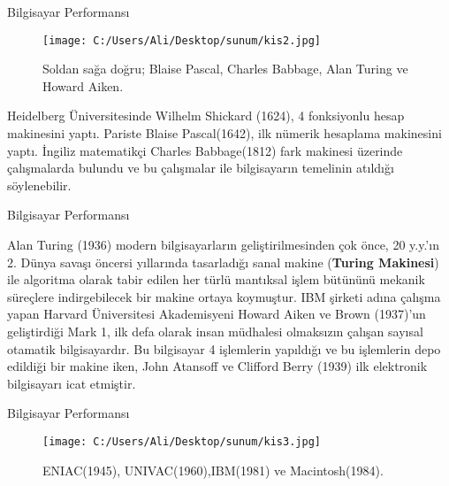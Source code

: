 \documentclass[
  12pt,
  ignorenonframetext,
]{beamer}
\begin{document}
\begin{frame}{Bilgisayar Performansı}
\protect\hypertarget{bilgisayar-performansux131-2}{}

\begin{figure}
\centering
\texttt{[image: C:/Users/Ali/Desktop/sunum/kis2.jpg]}
\caption{Soldan sağa doğru; Blaise Pascal, Charles Babbage, Alan Turing
ve Howard Aiken.}
\end{figure}

\justify

Heidelberg Üniversitesinde Wilhelm Shickard (1624), 4 fonksiyonlu hesap
makinesini yaptı. Pariste Blaise Pascal(1642), ilk nümerik hesaplama
makinesini yaptı. İngiliz matematikçi Charles Babbage(1812) fark
makinesi üzerinde çalışmalarda bulundu ve bu çalışmalar ile bilgisayarın
temelinin atıldığı söylenebilir.

\end{frame}

\begin{frame}{Bilgisayar Performansı}
\protect\hypertarget{bilgisayar-performansux131-3}{}

\justify

Alan Turing (1936) modern bilgisayarların geliştirilmesinden çok önce,
20 y.y.'ın 2. Dünya savaşı öncersi yıllarında tasarladığı sanal makine
(\textbf{Turing Makinesi}) ile algoritma olarak tabir edilen her türlü
mantıksal işlem bütününü mekanik süreçlere indirgebilecek bir makine
ortaya koymuştur. IBM şirketi adına çalışma yapan Harvard Üniversitesi
Akademisyeni Howard Aiken ve Brown (1937)'un geliştirdiği Mark 1, ilk
defa olarak insan müdhalesi olmaksızın çalışan sayısal otamatik
bilgisayardır. Bu bilgisayar 4 işlemlerin yapıldığı ve bu işlemlerin
depo edildiği bir makine iken, John Atansoff ve Clifford Berry (1939)
ilk elektronik bilgisayarı icat etmiştir.

\end{frame}

\begin{frame}{Bilgisayar Performansı}
\protect\hypertarget{bilgisayar-performansux131-4}{}

\begin{figure}
\centering
\texttt{[image: C:/Users/Ali/Desktop/sunum/kis3.jpg]}
\caption{ENIAC(1945), UNIVAC(1960),IBM(1981) ve Macintosh(1984).}
\end{figure}

\end{frame}
\end{document}

